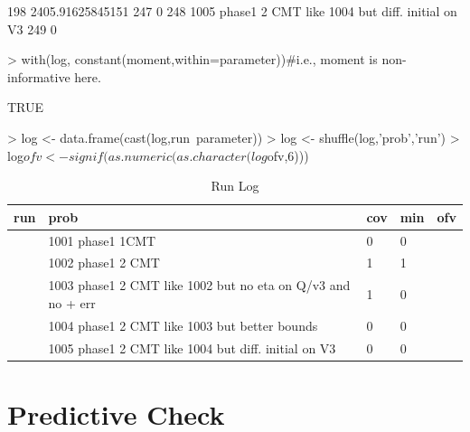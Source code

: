 \begin{Schunk}
\begin{Soutput}
198                                            2405.91625845151
247                                                           0
248         1005 phase1 2 CMT like 1004 but diff. initial on V3
249                                                           0
\end{Soutput}
\begin{Sinput}
> with(log, constant(moment,within=parameter))#i.e., moment is non-informative here.
\end{Sinput}
\begin{Soutput}
[1] TRUE
\end{Soutput}
\begin{Sinput}
> log <- data.frame(cast(log,run~parameter))
> log <- shuffle(log,'prob','run')
> log$ofv <- signif(as.numeric(as.character(log$ofv,6)))
\end{Sinput}
\end{Schunk}
\begin{table}[!htpb]
 \caption[Run Log]{Run Log \label{runlog}}
 \begin{center}
  \begin{tabular}{rlllr}
    \hline \hline
   run & prob & cov & min & ofv \\ \hline
   \verb#1001# & 1001 phase1 1CMT                                            & 0 & 0 & \verb#2526.40# \\
   \verb#1002# & 1002 phase1 2 CMT                                           & 1 & 1 & \verb#2525.97# \\
   \verb#1003# & 1003 phase1 2 CMT like 1002 but no eta on Q/v3 and no + err & 1 & 0 & \verb#2569.89# \\
   \verb#1004# & 1004 phase1 2 CMT like 1003 but better bounds               & 0 & 0 & \verb#2570.45# \\
   \verb#1005# & 1005 phase1 2 CMT like 1004 but diff. initial on V3         & 0 & 0 & \verb#2405.92# \\ \hline
  \end{tabular}
 \end{center}
\end{table}\section{Predictive Check}
